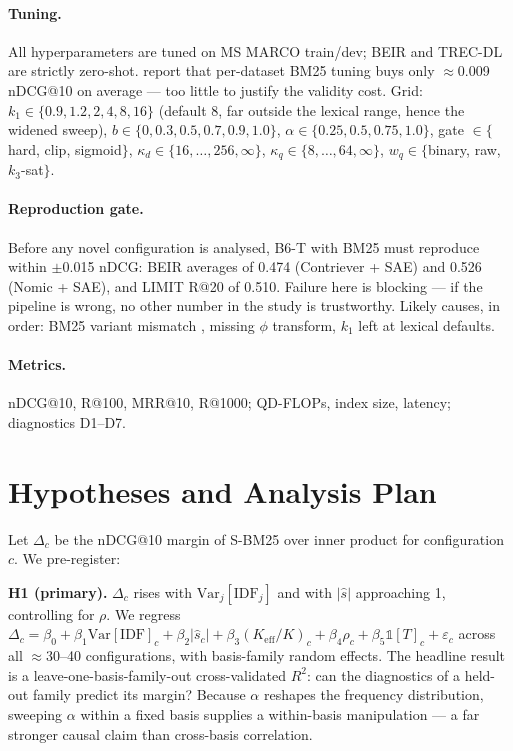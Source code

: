 \documentclass[11pt]{article}
\newcommand{\idf}{\mathrm{IDF}}
\begin{document}
\paragraph{Tuning.} All hyperparameters are tuned on MS MARCO train/dev; BEIR and TREC-DL are strictly zero-shot. \citet{clavie2026latent} report that per-dataset BM25 tuning buys only $\approx$0.009 nDCG@10 on average --- too little to justify the validity cost. Grid: $k_1\in\{0.9,1.2,2,4,8,16\}$ (default 8, far outside the lexical range, hence the widened sweep), $b\in\{0,0.3,0.5,0.7,0.9,1.0\}$, $\alpha\in\{0.25,0.5,0.75,1.0\}$, gate $\in\{$hard, clip, sigmoid$\}$, $\kappa_d\in\{16,\dots,256,\infty\}$, $\kappa_q\in\{8,\dots,64,\infty\}$, $w_q\in\{$binary, raw, $k_3$-sat$\}$.

\paragraph{Reproduction gate.} Before any novel configuration is analysed, B6-T with BM25 must reproduce \citet{clavie2026latent} within $\pm$0.015 nDCG: BEIR averages of 0.474 (Contriever + SAE) and 0.526 (Nomic + SAE), and LIMIT R@20 of 0.510. Failure here is blocking --- if the pipeline is wrong, no other number in the study is trustworthy. Likely causes, in order: BM25 variant mismatch \citep{kamphuis2020which}, missing $\phi$ transform, $k_1$ left at lexical defaults.

\paragraph{Metrics.} nDCG@10, R@100, MRR@10, R@1000; QD-FLOPs, index size, latency; diagnostics D1--D7.

\section{Hypotheses and Analysis Plan}

Let $\Delta_c$ be the nDCG@10 margin of S-BM25 over inner product for configuration $c$. We pre-register:

\textbf{H1 (primary).} $\Delta_c$ rises with $\mathrm{Var}_j[\idf_j]$ and with $|\hat s|$ approaching 1, controlling for $\rho$. We regress
$\Delta_c=\beta_0+\beta_1\mathrm{Var}[\idf]_c+\beta_2|\hat s_c|+\beta_3 (K_{\text{eff}}/K)_c+\beta_4\rho_c+\beta_5\mathbb{1}[T]_c+\varepsilon_c$
across all $\approx$30--40 configurations, with basis-family random effects. The headline result is a leave-one-basis-family-out cross-validated $R^2$: can the diagnostics of a held-out family predict its margin? Because $\alpha$ reshapes the frequency distribution, sweeping $\alpha$ within a fixed basis supplies a within-basis manipulation --- a far stronger causal claim than cross-basis correlation.
\end{document}
